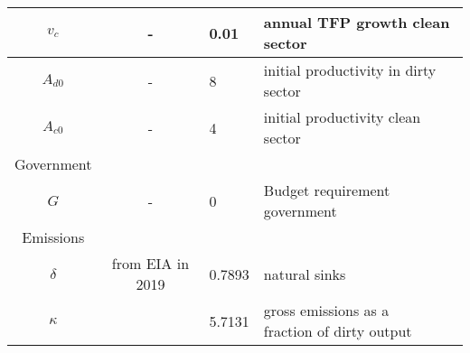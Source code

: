 \begin{table}[hh!!!!!]
\begin{center}
\begin{tabular}{c|cll}
				$v_c$&- &0.01& annual TFP growth clean sector\\
					\hline
				$A_{d0}$&- &8& initial productivity in dirty sector\\
				\hline
					$A_{c0}$&- &4& initial productivity clean sector\\
					\hline
				\hline
				Government&\multicolumn{3}{c}{}\\
				\hline
				\hline
				$G$&- &0& Budget requirement government\\
				\hline
				
				\hline
				Emissions&\multicolumn{3}{c}{}\\
				\hline
				
				\hline
				$\delta$&from EIA in 2019&0.7893&natural sinks \\
				\hline
				$\kappa$& &5.7131& \makecell[l]{ gross emissions as a\\ fraction of dirty output}\\
				\hline \hline
			\end{tabular}
		\end{center}
	\end{table}